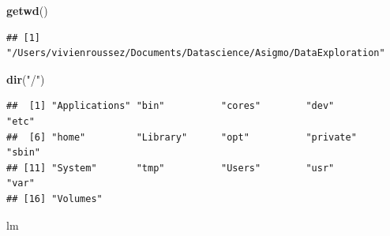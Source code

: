 \documentclass[
]{book}
\newenvironment{Shaded}{\begin{snugshade}}{\end{snugshade}}
\newcommand{\KeywordTok}[1]{\textcolor[rgb]{0.13,0.29,0.53}{\textbf{#1}}}
\newcommand{\NormalTok}[1]{#1}
\newcommand{\StringTok}[1]{\textcolor[rgb]{0.31,0.60,0.02}{#1}}
\begin{document}
\begin{Shaded}
\begin{Highlighting}[]
\KeywordTok{getwd}\NormalTok{()}
\end{Highlighting}
\end{Shaded}

\begin{verbatim}
## [1] "/Users/vivienroussez/Documents/Datascience/Asigmo/DataExploration"
\end{verbatim}

\begin{Shaded}
\begin{Highlighting}[]
\KeywordTok{dir}\NormalTok{(}\StringTok{"/"}\NormalTok{)}
\end{Highlighting}
\end{Shaded}

\begin{verbatim}
##  [1] "Applications" "bin"          "cores"        "dev"          "etc"         
##  [6] "home"         "Library"      "opt"          "private"      "sbin"        
## [11] "System"       "tmp"          "Users"        "usr"          "var"         
## [16] "Volumes"
\end{verbatim}

\begin{Shaded}
\begin{Highlighting}[]
\NormalTok{lm}
\end{Highlighting}
\end{Shaded}
\end{document}
